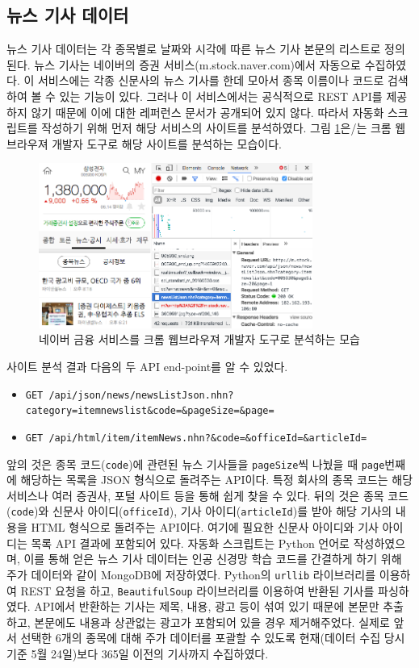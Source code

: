\documentclass[a4paper,10pt]{article}
\begin{document}
\subsection{뉴스 기사 데이터}

뉴스 기사 데이터는 각 종목별로 날짜와 시각에 따른 뉴스 기사 본문의 리스트로 정의된다.
뉴스 기사는 네이버의 증권 서비스(m.stock.naver.com)에서 자동으로 수집하였다.
이 서비스에는 각종 신문사의 뉴스 기사를 한데 모아서 종목 이름이나 코드로 검색하여 볼 수 있는 기능이 있다.
그러나 이 서비스에서는 공식적으로 REST API를 제공하지 않기 때문에 이에 대한 레퍼런스 문서가 공개되어 있지 않다.
따라서 자동화 스크립트를 작성하기 위해 먼저 해당 서비스의 사이트를 분석하였다.
그림 \ref{fig:naver_stock}은/는 크롬 웹브라우져 개발자 도구로 해당 사이트를 분석하는 모습이다.
\begin{figure}[h]
\includegraphics[width=0.8\textwidth]{naver_stock}
\centering
\caption{네이버 금융 서비스를 크롬 웹브라우져 개발자 도구로 분석하는 모습}
\label{fig:naver_stock}
\end{figure}
사이트 분석 결과 다음의 두 API end-point를 알 수 있었다.
\begin{itemize}
\item \texttt{GET /api/json/news/newsListJson.nhn?category=itemnewslist\&code=\&pageSize=\&page=}
\item \texttt{GET /api/html/item/itemNews.nhn?\&code=\&officeId=\&articleId=}
\end{itemize}
앞의 것은 종목 코드(\texttt{code})에 관련된 뉴스 기사들을 \texttt{pageSize}씩 나눴을 때 \texttt{page}번째에 해당하는 목록을 JSON 형식으로 돌려주는 API이다.
특정 회사의 종목 코드는 해당 서비스나 여러 증권사, 포털 사이트 등을 통해 쉽게 찾을 수 있다.
뒤의 것은 종목 코드(\texttt{code})와 신문사 아이디(\texttt{officeId}), 기사 아이디(\texttt{articleId})를 받아 해당 기사의 내용을 HTML 형식으로 돌려주는 API이다.
여기에 필요한 신문사 아이디와 기사 아이디는 목록 API 결과에 포함되어 있다.
자동화 스크립트는 Python 언어로 작성하였으며, 이를 통해 얻은 뉴스 기사 데이터는 인공 신경망 학습 코드를 간결하게 하기 위해 주가 데이터와 같이 MongoDB에 저장하였다.
Python의 \texttt{urllib} 라이브러리를 이용하여 REST 요청을 하고, \texttt{BeautifulSoup} 라이브러리를 이용하여 반환된 기사를 파싱하였다.
API에서 반환하는 기사는 제목, 내용, 광고 등이 섞여 있기 때문에 본문만 추출하고, 본문에도 내용과 상관없는 광고가 포함되어 있을 경우 제거해주었다.
실제로 앞서 선택한 6개의 종목에 대해 주가 데이터를 포괄할 수 있도록 현재(데이터 수집 당시 기준 5월 24일)보다 365일 이전의 기사까지 수집하였다.
\end{document}
